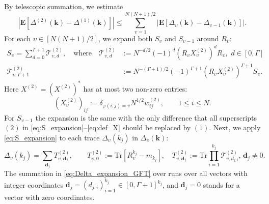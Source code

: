 \documentclass[10pt]{amsart}
\numberwithin{equation}{section}
\newcommand{\E}{\mathbf{E}}
\newcommand{\Tr}{\mathrm{Tr}}
\begin{document}
By telescopic summation, we estimate
\begin{equation}
\left\vert \E \left[\Delta^{(2)}(\bm{k}) -  \Delta^{(1)}(\bm{k})\right]\right\vert \le \sum_{\upsilon=1}^{N(N+1)/2} \left\vert\E\left[ \Delta_\upsilon (\bm{k})-\Delta_{\upsilon-1} (\bm{k})\right]\right\vert.
\end{equation}
For each $\upsilon\in [N(N+1)/2]$, we expand both $S_\upsilon$ and $S_{\upsilon-1}$ around $R_\upsilon$:
\begin{equation}
\begin{split}
S_\upsilon = \sum_{d=0}^{\Gamma+1} \mathcal{T}^{(2)}_{\upsilon,d},\quad \text{where}\quad \mathcal{T}^{(2)}_{\upsilon,d}&:=N^{-d/2}(-1)^d(R_\upsilon X_\upsilon^{(2)})^dR_\upsilon,\,\, d\in [0,\Gamma]\\
 \mathcal{T}^{(2)}_{\upsilon,\Gamma+1} &:= N^{-(\Gamma+1)/2}(-1)^{\Gamma+1}(R_\upsilon X^{(2)}_\upsilon)^{\Gamma+1}S_\upsilon.
\end{split}
\label{eq:S_expansion}
\end{equation}
Here $X^{(2)}=(X^{(2)})^*$ has at most two non-zero entries:
\begin{equation}
(X^{(2)}_\upsilon)_{ij}:=\delta_{\varphi(i,j)=\upsilon} N^{1/2}w^{(2)}_{ij},\qquad 1\le i \le N.
\label{eq:def_X}
\end{equation}
For $S_{\upsilon-1}$ the expansion is the same with the only difference that all superscripts $(2)$ in \eqref{eq:S_expansion}--\eqref{eq:def_X} should be replaced by $(1)$. Next, we apply \eqref{eq:S_expansion} to each trace $\Delta_\upsilon(k_j)$ in $\Delta_\upsilon(\bm{k})$:
\begin{equation}
\Delta_\upsilon(k_j) = \sum_{\bm{d}_j} T_{\upsilon, \bm{d}_j}^{(2)}, \qquad  T_{\upsilon, 0}^{(2)}:=\Tr\left[R^{k_j}_\upsilon-m_{k_j}\right],\quad  T_{\upsilon, \bm{d}_j}^{(2)}:=\Tr \prod_{i=1}^{k_j}\mathcal{T}_{\upsilon,d_{j,i}}^{(2)},\, \bm{d}_j\neq 0. 
\label{eq:Delta_expansion_GFT}
\end{equation}
The summation in \eqref{eq:Delta_expansion_GFT} over runs over all vectors with integer coordinates $\bm{d}_j=(d_{j,i})_{i=1}^{k_j}\in [0,\Gamma+1]^{k_j}$, and $\bm{d}_j=0$ stands for a vector with zero coordinates.
\end{document}
